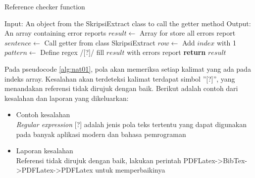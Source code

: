 \begin{enumerate}
\begin{minipage}{1.0\linewidth}
\begin{algorithm}[H]
    \caption{Reference checker function}
	\label{alg:nat01}
	\begin{algorithmic}[1]
    		\State Input: An object from the SkripsiExtract class to call the getter method
			\State Output: An array containing error reports
			\State $result \gets$ Array for store all errors report
			\State $sentence \gets$ Call getter from class SkripsiExtract
    			\State $row \gets$ Add $index$ with 1
				\State $pattern \gets$ Define regex /[?]/
                	\State fill $result$ with errors report
            	\EndIf
        	\EndFor
    		\State \textbf{return} $result$
    	\EndFunction
	\end{algorithmic}
\end{algorithm}
\end{minipage}
\medskip

	Pada pseudocode \ref{alg:nat01}, pola akan memeriksa setiap kalimat yang ada pada indeks array. Kesalahan akan terdeteksi kalimat terdapat simbol ''[?]'', yang menandakan referensi tidak dirujuk dengan baik. Berikut adalah contoh dari kesalahan dan laporan yang dikeluarkan:
	
	\begin{itemize}
		\item Contoh kesalahan \\
		\textit{Regular expression} [?] adalah jenis pola teks tertentu yang dapat digunakan pada banyak aplikasi modern dan bahasa pemrograman
		\item Laporan kesalahan \\
		Referensi tidak dirujuk dengan baik, lakukan perintah PDFLatex->BibTex->PDFLatex->PDFLatex untuk memperbaikinya
	\end{itemize}		
	
\end{enumerate}